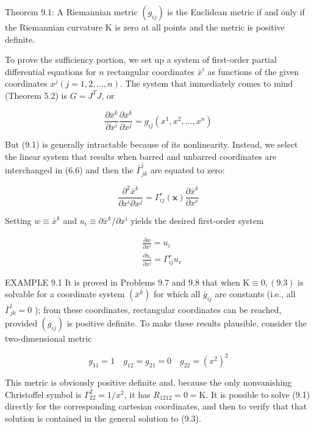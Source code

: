 \documentclass[10pt]{article}
\begin{document}
Theorem 9.1: A Riemannian metric $\left(g_{i j}\right)$ is the Euclidean metric if and only if the Riemannian curvature $\mathrm{K}$ is zero at all points and the metric is positive definite.

To prove the sufficiency portion, we set up a system of first-order partial differential equations for $n$ rectangular coordinates $\bar{x}^{i}$ as functions of the given coordinates $x^{j}(j=1,2, \ldots, n)$. The system that immediately comes to mind (Theorem 5.2) is $G=J^{T} J$, or


\begin{equation*}
\frac{\partial \bar{x}^{k}}{\partial x^{i}} \frac{\partial \bar{x}^{k}}{\partial x^{j}}=g_{i j}\left(x^{1}, x^{2}, \ldots, x^{n}\right) \tag{9.1}
\end{equation*}


But (9.1) is generally intractable because of its nonlinearity. Instead, we select the linear system that results when barred and unbarred coordinates are interchanged in (6.6) and then the $\bar{\Gamma}_{j k}^{i}$ are equated to zero:


\begin{equation*}
\frac{\partial^{2} \bar{x}^{k}}{\partial x^{i} \partial x^{j}}=\Gamma_{i j}^{r}(\mathbf{x}) \frac{\partial \bar{x}^{k}}{\partial x^{r}} \tag{9.2}
\end{equation*}


Setting $w \equiv \bar{x}^{k}$ and $u_{i} \equiv \partial \bar{x}^{k} / \partial x^{i}$ yields the desired first-order system


\begin{align*}
& \frac{\partial w}{\partial x^{i}}=u_{i} \\
& \frac{\partial u_{i}}{\partial x^{j}}=\Gamma_{i j}^{r} u_{r} \tag{9.3}
\end{align*}


EXAMPLE 9.1 It is proved in Problems 9.7 and 9.8 that when $\mathrm{K} \equiv 0,(9.3)$ is solvable for a coordinate system $\left(\bar{x}^{k}\right)$ for which all $\bar{g}_{i j}$ are constants (i.e., all $\bar{\Gamma}_{j k}^{i}=0$ ); from these coordinates, rectangular coordinates can be reached, provided $\left(g_{i j}\right)$ is positive definite. To make these results plausible, consider the two-dimensional metric

$$
g_{11}=1 \quad g_{12}=g_{21}=0 \quad g_{22}=\left(x^{2}\right)^{2}
$$

This metric is obviously positive definite and, because the only nonvanishing Christoffel symbol is $\Gamma_{22}^{2}=1 / x^{2}$, it has $R_{1212}=0=\mathrm{K}$. It is possible to solve (9.1) directly for the corresponding cartesian coordinates, and then to verify that that solution is contained in the general solution to (9.3).
\end{document}
